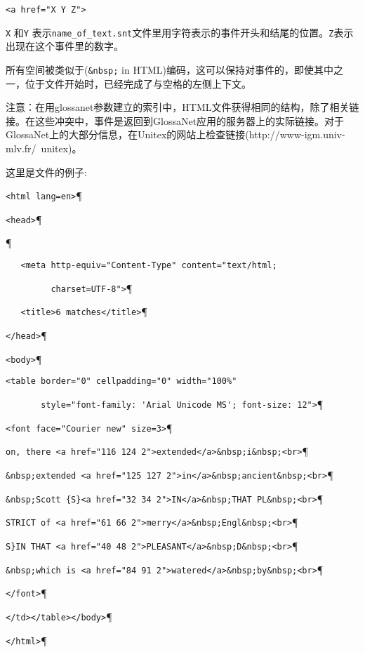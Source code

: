\medskip
\verb+<a href="X Y Z">+

\medskip
\noindent \verb+X+ 和\verb+Y+ 表示\verb+name_of_text.snt+文件里用字符表示的事件开头和结尾的位置。\verb+Z+表示出现在这个事件里的数字。

\bigskip
\noindent
所有空间被类似于(\verb+&nbsp;+ in HTML)编码，这可以保持对事件的，即使其中之一，位于文件开始时，已经完成了与空格的左侧上下文。



\bigskip
\noindent
注意：在用glossanet参数建立的索引中，HTML文件获得相同的结构，除了相关链接。在这些冲突中，事件是返回到GlossaNet应用的服务器上的实际链接。对于GlossaNet上的大部分信息，在Unitex的网站上检查链接(http://www-igm.univ-mlv.fr/~unitex)。



\bigskip
\noindent 这里是文件的例子:

\bigskip

\verb$<html lang=en>$\P

\verb$<head>$\P

\verb$$\P

\verb$   <meta http-equiv="Content-Type" content="text/html;$

\verb$         charset=UTF-8">$\P

\verb$   <title>6 matches</title>$\P

\verb$</head>$\P

\verb$<body>$\P

\verb$<table border="0" cellpadding="0" width="100%" $

\verb$       style="font-family: 'Arial Unicode MS'; font-size: 12">$\P

\verb$<font face="Courier new" size=3>$\P

\verb$on, there <a href="116 124 2">extended</a>&nbsp;i&nbsp;<br>$\P

\verb$&nbsp;extended <a href="125 127 2">in</a>&nbsp;ancient&nbsp;<br>$\P

\verb$&nbsp;Scott {S}<a href="32 34 2">IN</a>&nbsp;THAT PL&nbsp;<br>$\P

\verb$STRICT of <a href="61 66 2">merry</a>&nbsp;Engl&nbsp;<br>$\P

\verb+S}IN THAT <a href="40 48 2">PLEASANT</a>&nbsp;D&nbsp;<br>+\P

\verb+&nbsp;which is <a href="84 91 2">watered</a>&nbsp;by&nbsp;<br>+\P

\verb$</font>$\P

\verb$</td></table></body>$\P

\verb$</html>$\P


